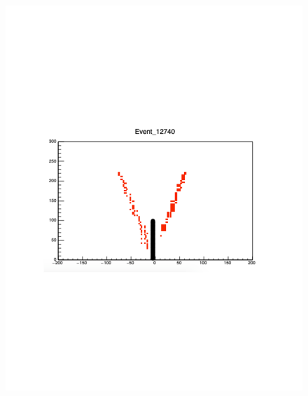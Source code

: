 \documentclass[final,number,sort&compress,5p,times,twocolumn]{elsarticle}
\begin{document}
\begin{figure}[hbt!]
	  
	  \includegraphics[width=\linewidth]{figures/9C_Inelastic_Event_1}
	  

\end{figure}
\end{document}
